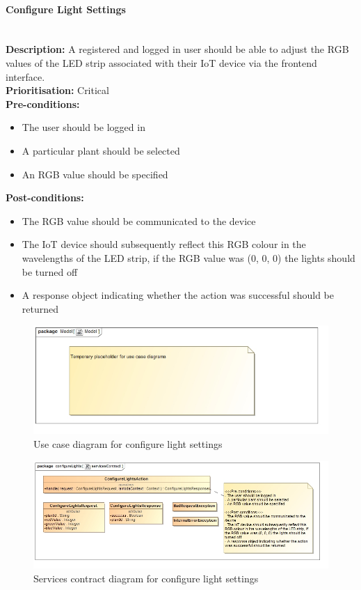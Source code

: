 \documentclass{article}
\begin{document}
	\paragraph{Configure Light Settings}\mbox{}\\
		\textbf{Description:} A registered and logged in user should be able to adjust the RGB values of the LED strip associated with their IoT device via the frontend interface.\\
		\textbf{Prioritisation:} Critical\\		
		\textbf{Pre-conditions:}
			\begin{itemize}
				\item The user should be logged in
				\item A particular plant should be selected
				\item An RGB value should be specified
			\end{itemize}
		\textbf{Post-conditions:}
			\begin{itemize}
				\item The RGB value should be communicated to the device
				\item The IoT device should subsequently reflect this RGB colour in the wavelengths of the LED strip, if the RGB value was (0, 0, 0) the lights should be turned off
				\item A response object indicating whether the action was successful should be returned
			\end{itemize}

		\begin{figure}[H]
			\includegraphics[width=\linewidth]{images/tempUseCase.jpg}
			\caption{Use case diagram for configure light settings}
		\end{figure}
		
		\begin{figure}[H]
			\includegraphics[width=\linewidth]{images/ServicesContracts/configureLights.jpg}
			\caption{Services contract diagram for configure light settings}
		\end{figure}
		
\end{document}
